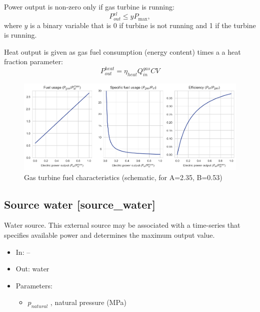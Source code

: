 \documentclass[12pt]{article}
\begin{document}
Power output is non-zero only if gas turbine is running:
\begin{equation}
	 P_{out}^{el} \leq yP_{\max },
\end{equation}
where  $y$ is a binary variable that is 0 if turbine is not running and 1 if the turbine is running.

Heat output is given as gas fuel consumption (energy content) times a a heat fraction parameter:
 \begin{equation}
	P_{out}^{heat}= \eta _{heat}Q_{in}^{gas} CV
\end{equation}



\begin{figure}[]
\centering
		\includegraphics[width=\columnwidth]{./media/gt_fuel_curves.png}
		\caption{Gas turbine fuel characteristics (schematic, for A=2.35, B=0.53)}
		\label{fig:gasturbine_fuel}
\end{figure}



\subsection{Source water [source\_water]}

Water source. 
This external source may be associated with a time-series that specifies available power and determines the maximum output value.

\begin{itemize}
\item In: --
\item Out: water
\item Parameters: 
\begin{itemize}[noitemsep,topsep=0pt]
	\item $p_{natural}$ , natural pressure (MPa)
\end{itemize}
\end{itemize}
\end{document}
